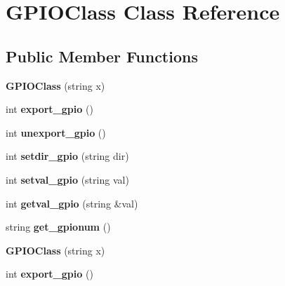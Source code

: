 \hypertarget{classGPIOClass}{}\section{G\+P\+I\+O\+Class Class Reference}
\label{classGPIOClass}
\subsection*{Public Member Functions}
\begin{DoxyCompactItemize}
\item 
\mbox{\label{classGPIOClass_a6578c36830f2e62334fcc5ccb489a7cb}} 
{\bfseries G\+P\+I\+O\+Class} (string x)
\item 
\mbox{\label{classGPIOClass_a08ed267741cb5419fb31eb50cc44dad2}} 
int {\bfseries export\+\_\+gpio} ()
\item 
\mbox{\label{classGPIOClass_aa1a4bf427bed8843171613b439f594bf}} 
int {\bfseries unexport\+\_\+gpio} ()
\item 
\mbox{\label{classGPIOClass_a51bafa7393d411f32ababfab1cf2852a}} 
int {\bfseries setdir\+\_\+gpio} (string dir)
\item 
\mbox{\label{classGPIOClass_a548c98646daa503029a2cd9f8782a6ae}} 
int {\bfseries setval\+\_\+gpio} (string val)
\item 
\mbox{\label{classGPIOClass_a56b8e3f86419ef319e91847ab2ca1ec1}} 
int {\bfseries getval\+\_\+gpio} (string \&val)
\item 
\mbox{\label{classGPIOClass_a1ebffcb1b82454f8e6648c7e9ad45659}} 
string {\bfseries get\+\_\+gpionum} ()
\item 
\mbox{\label{classGPIOClass_a6578c36830f2e62334fcc5ccb489a7cb}} 
{\bfseries G\+P\+I\+O\+Class} (string x)
\item 
\mbox{\label{classGPIOClass_a08ed267741cb5419fb31eb50cc44dad2}} 
int {\bfseries export\+\_\+gpio} ()
\item 
\mbox{\label{classGPIOClass_aa1a4bf427bed8843171613b439f594bf}} 

\end{DoxyCompactItemize}

